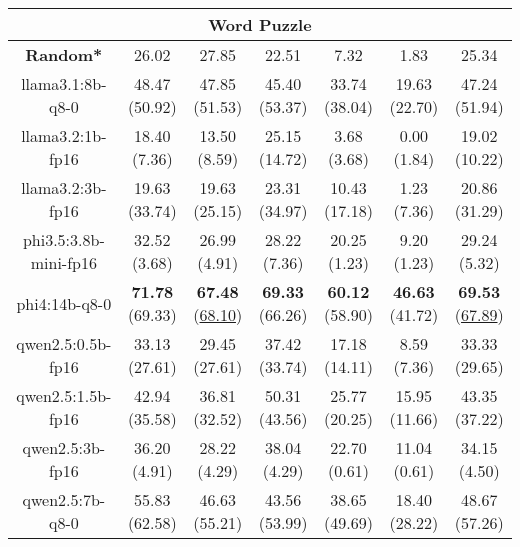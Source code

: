 \begin{table}[hbp]
{\begin{tabular}{ccccccc}
\hline
\multicolumn{7}{c}{Word Puzzle} \\ \hline
\multicolumn{1}{c|}{\textbf{Random*}} & 26.02 & 27.85 & \multicolumn{1}{c|}{22.51} & 7.32 & \multicolumn{1}{c|}{1.83} & 25.34 \\ \hline

        \multicolumn{1}{c|}{llama3.1:8b-q8-0} & 48.47 (50.92) & 47.85 (51.53) & \multicolumn{1}{c|}{45.40 (53.37)} & 33.74 (38.04) & \multicolumn{1}{c|}{19.63 (22.70)} & 47.24 (51.94) \\
        

        \multicolumn{1}{c|}{llama3.2:1b-fp16} & 18.40 (7.36) & 13.50 (8.59) & \multicolumn{1}{c|}{25.15 (14.72)} & 3.68 (3.68) & \multicolumn{1}{c|}{0.00 (1.84)} & 19.02 (10.22) \\
        

        \multicolumn{1}{c|}{llama3.2:3b-fp16} & 19.63 (33.74) & 19.63 (25.15) & \multicolumn{1}{c|}{23.31 (34.97)} & 10.43 (17.18) & \multicolumn{1}{c|}{1.23 (7.36)} & 20.86 (31.29) \\
        

        \multicolumn{1}{c|}{phi3.5:3.8b-mini-fp16} & 32.52 (3.68) & 26.99 (4.91) & \multicolumn{1}{c|}{28.22 (7.36)} & 20.25 (1.23) & \multicolumn{1}{c|}{9.20 (1.23)} & 29.24 (5.32) \\
        

        \multicolumn{1}{c|}{phi4:14b-q8-0} & \textbf{71.78} (69.33) & \textbf{67.48} (\underline{68.10}) & \multicolumn{1}{c|}{\textbf{69.33} (66.26)} & \textbf{60.12} (58.90) & \multicolumn{1}{c|}{\textbf{46.63} (41.72)} & \textbf{69.53} (\underline{67.89}) \\
        

        \multicolumn{1}{c|}{qwen2.5:0.5b-fp16} & 33.13 (27.61) & 29.45 (27.61) & \multicolumn{1}{c|}{37.42 (33.74)} & 17.18 (14.11) & \multicolumn{1}{c|}{8.59 (7.36)} & 33.33 (29.65) \\
        

        \multicolumn{1}{c|}{qwen2.5:1.5b-fp16} & 42.94 (35.58) & 36.81 (32.52) & \multicolumn{1}{c|}{50.31 (43.56)} & 25.77 (20.25) & \multicolumn{1}{c|}{15.95 (11.66)} & 43.35 (37.22) \\
        

        \multicolumn{1}{c|}{qwen2.5:3b-fp16} & 36.20 (4.91) & 28.22 (4.29) & \multicolumn{1}{c|}{38.04 (4.29)} & 22.70 (0.61) & \multicolumn{1}{c|}{11.04 (0.61)} & 34.15 (4.50) \\
        

        \multicolumn{1}{c|}{qwen2.5:7b-q8-0} & 55.83 (62.58) & 46.63 (55.21) & \multicolumn{1}{c|}{43.56 (53.99)} & 38.65 (49.69) & \multicolumn{1}{c|}{18.40 (28.22)} & 48.67 (57.26) \\
        


\end{tabular}}
\end{table}

